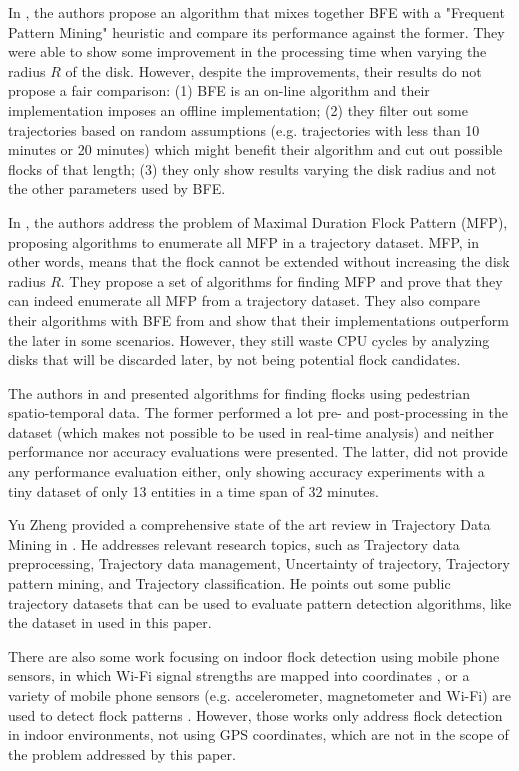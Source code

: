 In \cite{bib:visual}, the authors propose an algorithm that mixes together BFE \cite{bib:vieira} with a "Frequent
Pattern Mining" heuristic and compare its performance against the former. They were able to show some improvement in the
processing time when varying the radius $R$ of the disk. However, despite the improvements, their results do not propose
a fair comparison: (1) BFE is an on-line algorithm and their implementation imposes an offline implementation; (2) they
filter out some trajectories based on random assumptions (e.g. trajectories with less than 10 minutes or 20 minutes)
which might benefit their algorithm and cut out possible flocks of that length; (3) they only show results varying the
disk radius and not the other parameters used by BFE.

In \cite{bib:enumeration}, the authors address the problem of Maximal Duration Flock Pattern (MFP), proposing algorithms
to enumerate all MFP in a trajectory dataset. MFP, in other words, means that the flock cannot be extended without
increasing the disk radius $R$. They propose a set of algorithms for finding MFP and prove that they can indeed
enumerate all MFP from a trajectory dataset. They also compare their algorithms with BFE from \cite{bib:vieira} and show
that their implementations outperform the later in some scenarios. However, they still waste CPU cycles by analyzing
disks that will be discarded later, by not being potential flock candidates.

The authors in \cite{bib:flockpedestrian} and \cite{bib:pedestriancanyons} presented algorithms for finding flocks using
pedestrian spatio-temporal data. The former performed a lot pre- and post-processing in the dataset (which makes not
possible to be used in real-time analysis) and neither performance nor accuracy evaluations were presented. The latter,
did not provide any performance evaluation either, only showing accuracy experiments with a tiny dataset of only 13
entities in a time span of 32 minutes.

Yu Zheng provided a comprehensive state of the art review in Trajectory Data Mining in \cite{bib:survey}. He addresses
relevant research topics, such as Trajectory data preprocessing, Trajectory data management, Uncertainty of trajectory,
Trajectory pattern mining, and Trajectory classification. He points out some public trajectory datasets that can be used
to evaluate pattern detection algorithms, like the dataset in \cite{bib:tdrive} used in this paper.

There are also some work focusing on indoor flock detection using mobile phone sensors, in which Wi-Fi signal strengths
are mapped into coordinates \cite{bib:mobile1}, or a variety of mobile phone sensors (e.g. accelerometer, magnetometer
and Wi-Fi) are used to detect flock patterns \cite{bib:mobile2}. However, those works only address flock detection in
indoor environments, not using GPS coordinates, which are not in the scope of the problem addressed by this paper.

